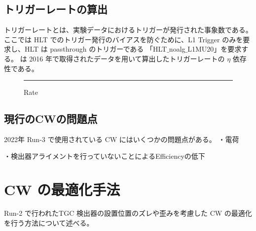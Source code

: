 \subsection{トリガーレートの算出}
トリガーレートとは、実験データにおけるトリガーが発行された事象数である。ここでは HLT でのトリガー発行のバイアスを防ぐために、L1 Trigger のみを要求し、HLT は passthrough のトリガーである 「HLT$\_$noalg$\_$L1MU20」を要求する。 は 2016 年で取得されたデータを用いて算出したトリガーレートの $\eta$ 依存性である。

\begin{figure}[tb]
  \centering
  \rule{8cm}{6cm}
  \caption{Rate}
  \label{fig:Run3_rate}
\end{figure}

\subsection{現行のCWの問題点}
2022年 Run-3 で使用されている CW にはいくつかの問題点がある。
・電荷


・検出器アライメントを行っていないことによるEfficiencyの低下



\section{CW の最適化手法}\label{section:最適化}
Run-2 で行われたTGC 検出器の設置位置のズレや歪みを考慮した CW の最適化を行う方法について述べる。

